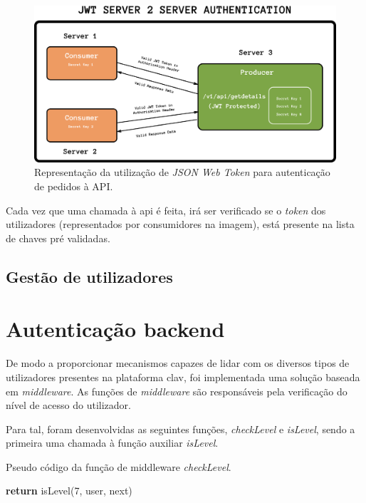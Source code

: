 \begin{figure}[h]
    \centering
    \includegraphics[width=\textwidth]{img/jwt/jwtAPI.png}
    \caption{Representação da utilização de \emph{JSON Web Token} para autenticação de pedidos à API. \cite{jwtAPI}}
\end{figure}

Cada vez que uma chamada à \gls{api} é feita, irá ser verificado se o \emph{token} dos utilizadores (representados por consumidores na imagem), está presente na lista de chaves pré validadas.

\cleardoublepage
\subsection{Gestão de utilizadores}

\cleardoublepage
\section{Autenticação backend}

De modo a proporcionar mecanismos capazes de lidar com os diversos tipos de utilizadores presentes na plataforma \gls{clav}, foi implementada uma solução baseada em \emph{middleware}. As funções de \emph{middleware} são responsáveis pela verificação do nível de acesso do utilizador. 

Para tal, foram desenvolvidas as seguintes funções, \emph{checkLevel} e \emph{isLevel}, sendo a primeira uma chamada à função auxiliar \emph{isLevel}.

\begin{algorithm}
    \caption{Pseudo código da função de middleware \emph{checkLevel}.}
    \begin{algorithmic}[1]
            \State \textbf{return} isLevel(7, user, next)
    \EndFunction
    \end{algorithmic}
\end{algorithm}

